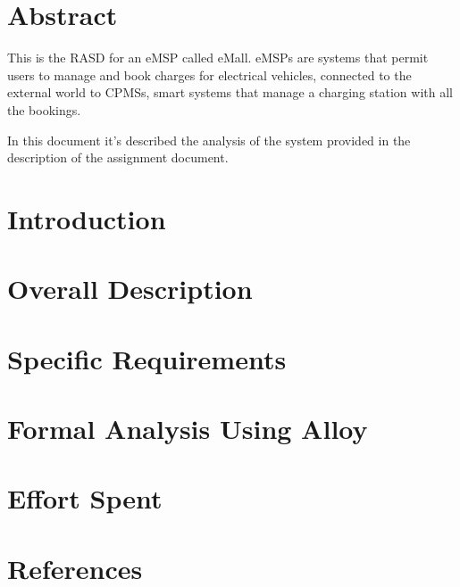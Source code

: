 \documentclass{TitlePage/Configuration_Files/PoliMi3i_thesis}
\begin{document}
\pagestyle{empty}


\section*{Abstract}
This is the \acf{RASD} for an \acf{eMSP} called \acf{eMall}. \acp{eMSP} are systems that permit users to manage and book charges for electrical vehicles, connected to the external world to \acfp{CPMS}, smart systems that manage a charging station with all the bookings.

In this document it's described the analysis of the system provided in the description of the assignment document.
\clearpage

\tableofcontents{}
\clearpage

\pagestyle{fancy}
\setcounter{page}{1} %

\section{Introduction}


\section{Overall Description}


\section{Specific Requirements}


\section{Formal Analysis Using Alloy}


\section{Effort Spent}


\section{References}

\end{document}
